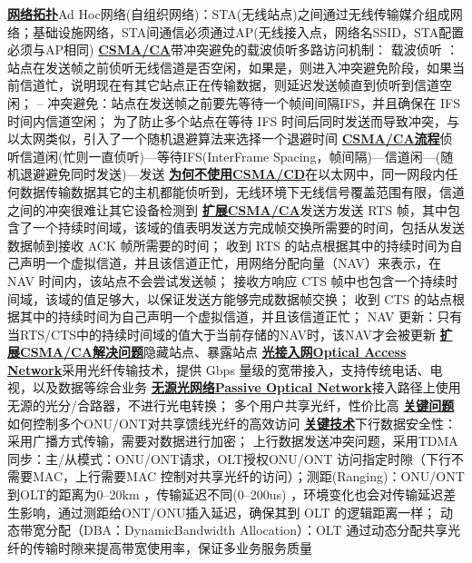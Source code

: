 \documentclass[twocolumn]{ctexart}
\renewcommand{\emph}[1]{\textbf{\underline{#1}}}
\begin{document}
\emph{网络拓扑}Ad Hoc网络(自组织网络)：STA(无线站点)之间通过无线传输媒介组成网络；基础设施网络，STA间通信必须通过AP(无线接入点，网络名SSID，STA配置必须与AP相同)
\emph{CSMA/CA}带冲突避免的载波侦听多路访问机制：
载波侦听 ：站点在发送帧之前侦听无线信道是否空闲，如果是，则进入冲突避免阶段，如果当前信道忙，说明现在有其它站点正在传输数据，则延迟发送帧直到侦听到信道空闲；
– 冲突避免：站点在发送帧之前要先等待一个帧间间隔IFS，并且确保在 IFS 时间内信道空闲；
为了防止多个站点在等待 IFS 时间后同时发送而导致冲突，与以太网类似，引入了一个随机退避算法来选择一个退避时间
\emph{CSMA/CA流程}侦听信道闲(忙则一直侦听)—等待IFS(InterFrame Spacing，帧间隔)—信道闲—(随机退避避免同时发送)—发送
\emph{为何不使用CSMA/CD}在以太网中，同一网段内任何数据传输数据其它的主机都能侦听到，无线环境下无线信号覆盖范围有限，信道之间的冲突很难让其它设备检测到
\emph{扩展CSMA/CA}发送方发送 RTS 帧，其中包含了一个持续时间域，该域的值表明发送方完成帧交换所需要的时间，包括从发送数据帧到接收 ACK 帧所需要的时间；
收到 RTS 的站点根据其中的持续时间为自己声明一个虚拟信道，并且该信道正忙，用网络分配向量（NAV）来表示，在 NAV 时间内，该站点不会尝试发送帧；
接收方响应 CTS 帧中也包含一个持续时间域，该域的值足够大，以保证发送方能够完成数据帧交换；
收到 CTS 的站点根据其中的持续时间为自己声明一个虚拟信道，并且该信道正忙；
NAV 更新：只有当RTS/CTS中的持续时间域的值大于当前存储的NAV时，该NAV才会被更新
\emph{扩展CSMA/CA解决问题}隐藏站点、暴露站点
\emph{光接入网Optical Access Network}采用光纤传输技术，提供 Gbps 量级的宽带接入，支持传统电话、电视，以及数据等综合业务
\emph{无源光网络Passive Optical Network}接入路径上使用无源的光分/合路器，不进行光电转换；
多个用户共享光纤，性价比高
\emph{关键问题}如何控制多个ONU/ONT对共享馈线光纤的高效访问
\emph{关键技术}下行数据安全性：采用广播方式传输，需要对数据进行加密；
上行数据发送冲突问题，采用TDMA同步：主/从模式：ONU/ONT请求，OLT授权ONU/ONT 访问指定时隙（下行不需要MAC，上行需要MAC 控制对共享光纤的访问）；测距(Ranging)：ONU/ONT到OLT的距离为0--20km ，传输延迟不同(0--200us) ，环境变化也会对传输延迟差生影响，通过测距给ONT/ONU插入延迟，确保其到 OLT 的逻辑距离一样；
动态带宽分配（DBA：DynamicBandwidth Allocation）：OLT 通过动态分配共享光纤的传输时隙来提高带宽使用率，保证多业务服务质量
\end{document}
